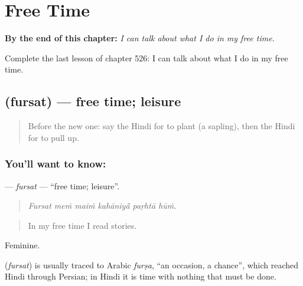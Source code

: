 
\chapter{Free Time}
\label{ch:hi-free-time}

\begin{chapteropening}
\textbf{By the end of this chapter:} \emph{I can talk about what I do in my free time.}

Complete the last lesson of chapter 526: I can talk about what I do in my free time.
\end{chapteropening}

\section[\texorpdfstring{\hi{फ़ुरसत} (fursat)}{फ़ुरसत (fursat)}]{ (fursat) — free time; leisure}

\label{lesson:HI-C526-fursat}



\begin{quote}
Before the new one: say the Hindi for to plant (a sapling), then the Hindi for to pull up.
\end{quote}

\subsection*{You'll want to know: }
\textbf{} — \emph{fursat} — \textquotedblleft{}free time; leisure\textquotedblright{}.

\begin{quote}
     
\end{quote}

\begin{quote}
\emph{Fursat meṁ maiṁ kahāniyā̃ paṛhtā hūṁ.}
\end{quote}

\begin{quote}
In my free time I read stories.
\end{quote}

Feminine.

\begin{cousinweb}
\textbf{} (\emph{fursat}) is usually traced to Arabic \emph{furṣa}, \textquotedblleft{}an occasion, a chance\textquotedblright{}, which reached Hindi through Persian; in Hindi it is time with nothing that must be done.
\end{cousinweb}

